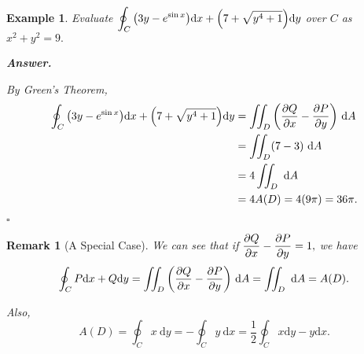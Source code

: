 \documentclass[12pt,a4paper]{article}
\newtheorem{eg}{Example}[subsection]
\newenvironment*{ans}{\par\indent\textbf{\textit{Answer. }}\par}{\par\hfill{$\square$}\par}
\newtheorem*{rmk}{\indent Remark}
\def\dsst{\displaystyle}
\def\d{{\mathrm{d}}}
\def\dx{\d x}
\def\dy{\d y}
\def\dA{\d A}
\def\iintD{\dsst\iint_D}
\def\ointC{\dsst\oint_C}
\begin{document}
\begin{eg}
	Evaluate $\ointC\qty(3y-e^{\sin{x}})\dx+\qty(7+\sqrt{y^4+1})\dy$ over $C$ as $x^2+y^2=9.$
	\begin{ans}
		By Green's Theorem, \[\begin{aligned}\ointC\qty(3y-e^{\sin{x}})\dx+\qty(7+\sqrt{y^4+1})\dy&=\iintD\qty(\pdv{Q}{x}-\pdv{P}{y})\ \dA\\&=\iintD(7-3)\ \dA\\&=4\iintD\ \dA\\&=4A(D)=4(9\pi)=36\pi.\end{aligned}\]
	\end{ans}
\end{eg}
\begin{rmk}[A Special Case]
	We can see that if $\dsst\pdv{Q}{x}-\pdv{P}{y}=1,$ we have \[\ointC P\dx+Q\dy=\iintD\qty(\pdv{Q}{x}-\pdv{P}{y})\ \dA=\iintD\ \dA=A(D).\]\par Also, \[A(D)=\ointC x\ \dy=-\ointC y\ \dx=\dfrac{1}{2}\ointC x\dy-y\dx.\]	
\end{rmk}
\end{document}
